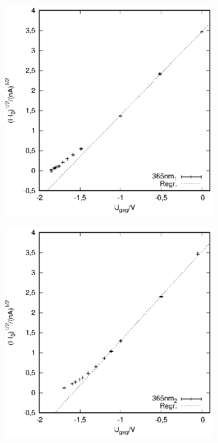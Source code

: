 \begin{figure}[h!]
  \centering
  \begin{subfigure}[h]{0.5\textwidth}
    \centering
    \includegraphics{data/Messung_photoeffekt/365nm_1.eps}
  \end{subfigure}%
  \begin{subfigure}[h]{0.5\textwidth}
    \centering
    \includegraphics{data/Messung_photoeffekt/365nm_2.eps}

\end{subfigure}
\end{figure}
